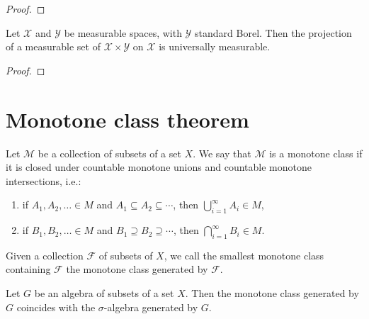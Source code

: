 \begin{proof}\leanok

\end{proof}


\begin{theorem}\label{thm:MeasurableSet.nullMeasurableSet_fst}
Let $\mathcal{X}$ and $\mathcal{Y}$ be measurable spaces, with $\mathcal{Y}$ standard Borel.
Then the projection of a measurable set of $\mathcal{X} \times \mathcal{Y}$ on $\mathcal{X}$ is universally measurable.
\end{theorem}

\begin{proof}  

\end{proof}




\section{Monotone class theorem}


\begin{definition}\label{def:monotone_class}
  \leanok
Let $\mathcal{M}$ be a collection of subsets of a set $X$. We say that $\mathcal{M}$ is a monotone class if it is closed under countable monotone unions and countable monotone intersections, i.e.:
\begin{enumerate}
  \item if \( A_1, A_2, \ldots \in M \) and \( A_1 \subseteq A_2 \subseteq \cdots \), then
  \( \bigcup_{i=1}^\infty A_i \in M \),
  \item if \( B_1, B_2, \ldots \in M \) and \( B_1 \supseteq B_2 \supseteq \cdots \), then
  \( \bigcap_{i=1}^\infty B_i \in M \).
\end{enumerate}
Given a collection $\mathcal{F}$ of subsets of $X$, we call the smallest monotone class containing $\mathcal{F}$ the monotone class generated by $\mathcal{F}$.
\end{definition}


\begin{theorem}\label{thm:monotone_class}
  \leanok
Let \(G\) be an algebra of subsets of a set \(X\). Then the monotone class generated by \(G\) coincides with the $\sigma$-algebra generated by \(G\).
\end{theorem}

